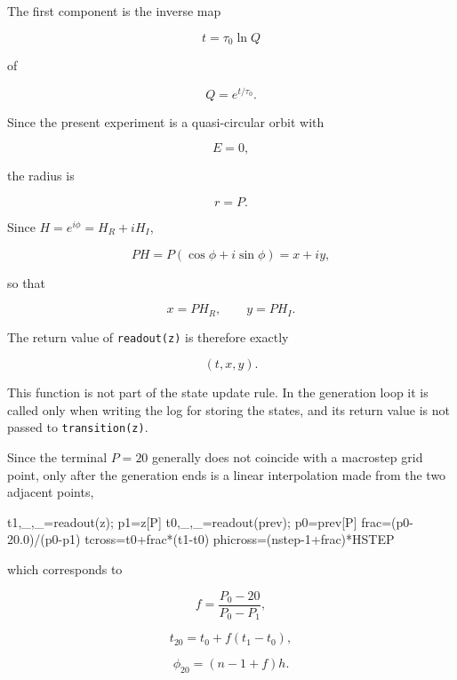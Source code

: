 \documentclass[
  a4paper,
]{article}
\newenvironment{Shaded}{}{}
\newcommand{\DecValTok}[1]{\textcolor[rgb]{0.25,0.63,0.44}{#1}}
\newcommand{\FloatTok}[1]{\textcolor[rgb]{0.25,0.63,0.44}{#1}}
\newcommand{\NormalTok}[1]{#1}
\newcommand{\OperatorTok}[1]{\textcolor[rgb]{0.40,0.40,0.40}{#1}}
\begin{document}
The first component is the inverse map

\[
\boxed{
t=\tau_0\ln Q}
\]

of

\[
Q=e^{t/\tau_0}.
\]

Since the present experiment is a quasi-circular orbit with

\[
E=0,
\]

the radius is

\[
r=P.
\]

Since \(H=e^{i\phi}=H_R+iH_I\),

\[
PH
=
P(\cos\phi+i\sin\phi)
=
x+iy,
\]

so that

\[
\boxed{
x=P H_R,
\qquad
y=P H_I}.
\]

The return value of \texttt{readout(z)} is therefore exactly

\[
(t,x,y).
\]

This function is not part of the state update rule. In the generation
loop it is called only when writing the log for storing the states, and
its return value is not passed to \texttt{transition(z)}.

Since the terminal \(P=20\) generally does not coincide with a macrostep
grid point, only after the generation ends is a linear interpolation
made from the two adjacent points,

\begin{Shaded}
\begin{Highlighting}[]
\NormalTok{t1,\_,\_}\OperatorTok{=}\NormalTok{readout(z)}\OperatorTok{;}\NormalTok{ p1}\OperatorTok{=}\NormalTok{z[P]}
\NormalTok{t0,\_,\_}\OperatorTok{=}\NormalTok{readout(prev)}\OperatorTok{;}\NormalTok{ p0}\OperatorTok{=}\NormalTok{prev[P]}
\NormalTok{frac}\OperatorTok{=}\NormalTok{(p0}\OperatorTok{{-}}\FloatTok{20.0}\NormalTok{)}\OperatorTok{/}\NormalTok{(p0}\OperatorTok{{-}}\NormalTok{p1)}
\NormalTok{tcross}\OperatorTok{=}\NormalTok{t0}\OperatorTok{+}\NormalTok{frac}\OperatorTok{*}\NormalTok{(t1}\OperatorTok{{-}}\NormalTok{t0)}
\NormalTok{phicross}\OperatorTok{=}\NormalTok{(nstep}\OperatorTok{{-}}\DecValTok{1}\OperatorTok{+}\NormalTok{frac)}\OperatorTok{*}\NormalTok{HSTEP}
\end{Highlighting}
\end{Shaded}

which corresponds to

\[
f
=
\frac{P_0-20}{P_0-P_1},
\]

\[
t_{20}=t_0+f(t_1-t_0),
\]

\[
\phi_{20}=(n-1+f)h.
\]
\end{document}
